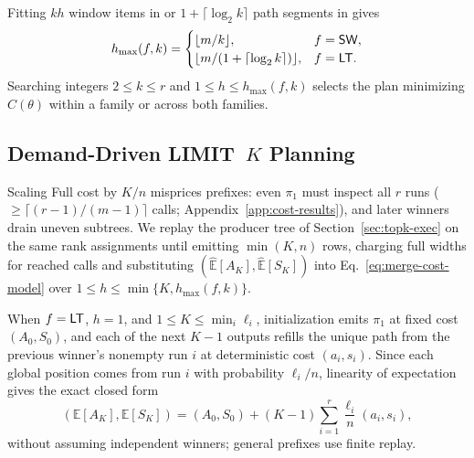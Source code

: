 Fitting $kh$ window items in \SW{} or $1+\lceil\log_2 k\rceil$ path segments in \LT{} gives
\begin{equation}
 h_{\max}(f,k)=
 \begin{cases}
   \lfloor m/k\rfloor, & f={\mathsf{SW}}{},\\
   \lfloor m/(1+\lceil\log_2 k\rceil)\rfloor, & f={\mathsf{LT}}{}.
 \end{cases}
 \label{eq:merge-capacity}
\end{equation}
Searching integers $2 \le k \le r$ and $1 \le h \le h_{\max}(f,k)$ selects the plan minimizing $\widehat C(\theta)$ within a family or across both families.

\subsection{Demand-Driven \texorpdfstring{\textsf{LIMIT}~$K$}{LIMIT K} Planning}
\label{sec:cost-limit}

Scaling Full cost by $K/n$ misprices prefixes: even $\pi_1$ must inspect all $r$ runs ($\ge \lceil(r-1)/(m-1)\rceil$ calls; Appendix~\ref{app:cost-results}), and later winners drain uneven subtrees. We replay the producer tree of Section~\ref{sec:topk-exec} on the same rank assignments until emitting $\min(K,n)$ rows, charging full widths for reached calls and substituting $(\widehat{\mathbb E}[A_K], \widehat{\mathbb E}[S_K])$ into Eq.~\eqref{eq:merge-cost-model} over $1 \le h \le \min\{K, h_{\max}(f,k)\}$.

When $f={\mathsf{LT}}{}$, $h{=}1$, and $1 \le K \le \min_i \ell_i$, initialization emits $\pi_1$ at fixed cost $(A_0, S_0)$, and each of the next $K-1$ outputs refills the unique path from the previous winner's nonempty run $i$ at deterministic cost $(a_i, s_i)$. Since each global position comes from run $i$ with probability $\ell_i / n$, linearity of expectation gives the exact closed form
\begin{equation}
 (\mathbb E[A_K],\mathbb E[S_K])=(A_0,S_0)
  +(K-1)\sum_{i=1}^{r}\frac{\ell_i}{n}(a_i,s_i),
 \label{eq:cost-limit-single}
\end{equation}
without assuming independent winners; general prefixes use finite replay.
